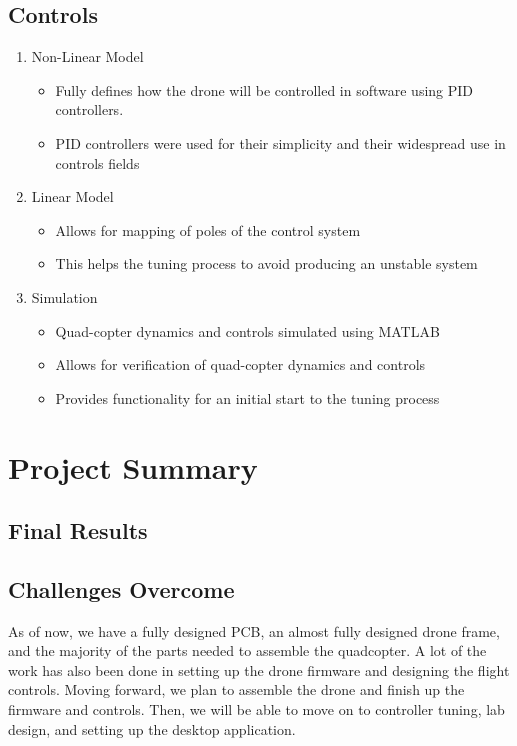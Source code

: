 \documentclass[12pt, titlepage]{article}
\begin{document}
\subsection{Controls}
\begin{enumerate}
		\item Non-Linear Model
		\begin{itemize}
			\item Fully defines how the drone will be controlled in software using PID controllers.
			\item PID controllers were used for their simplicity and their widespread use in controls fields
		\end{itemize}
		\item Linear Model
		\begin{itemize}
			\item Allows for mapping of poles of the control system
			\item This helps the tuning process to avoid producing an unstable system
		\end{itemize}
		\item Simulation
		\begin{itemize}
			\item Quad-copter dynamics and controls simulated using MATLAB
			\item Allows for verification of quad-copter dynamics and controls
			\item Provides functionality for an initial start to the tuning process 
		\end{itemize}
\end{enumerate}

\section{Project Summary}

\subsection{Final Results}

\subsection{Challenges Overcome}


As of now, we have a fully designed PCB, an almost fully designed drone frame, and the majority of the parts needed to assemble the quadcopter. A lot of the work has also been done in setting up the drone firmware and designing the flight controls. Moving forward, we plan to assemble the drone and finish up the firmware and controls. Then, we will be able to move on to controller tuning, lab design, and setting up the desktop application.
\end{document}
